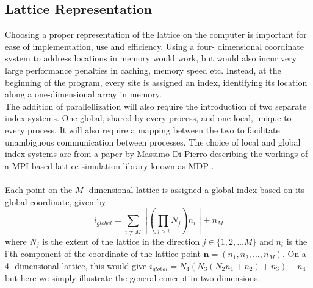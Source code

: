\documentclass[a4paper,10pt]{article}
\begin{document}
\subsection{Lattice Representation}
Choosing a proper representation of the lattice on the computer is important for ease of implementation, use and efficiency. Using a four- dimensional coordinate system to address locations in memory would work, but would also incur very large performance penalties in caching, memory speed etc. Instead, at the beginning of the program, every site is assigned an index, identifying its location along a one-dimensional array in memory.\\The addition of parallellization will also require the introduction of two separate index systems. One global, shared by every process, and one local, unique to every process. It will also require a mapping between the two to facilitate unambiguous communication between processes. The choice of local and global index systems are from a paper by Massimo Di Pierro describing the workings of a MPI based lattice simulation library known as MDP \cite{MDP}.\\\\Each point on the $M$- dimensional lattice is assigned a global index based on its global coordinate, given by 
\begin{equation}
i_{global} = \sum\limits_{i\neq M}\left[ \left( \prod\limits_{j> i}N_j \right)n_i \right] + n_M
\end{equation}
where $N_j$ is the extent of the lattice in the direction $j \in \{1,2,\ldots M \}$ and $n_i$ is the i'th component of the coordinate of the lattice point $\textbf{n} = (n_1,n_2,\ldots,n_M)$. On a 4- dimensional lattice, this would give $i_{global} = N_4(N_3(N_2n_1+n_2)+n_3)+n_4$ but here we simply illustrate the general concept in two dimensions.
\end{document}
